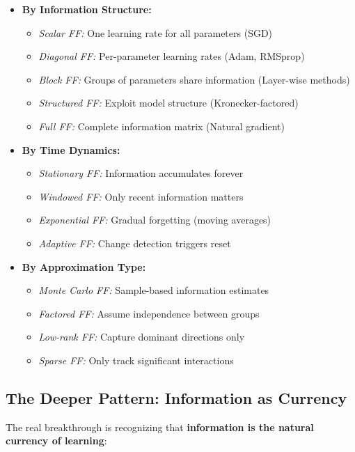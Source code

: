 \documentclass[11pt]{article}
\begin{document}
\begin{itemize}
\item \textbf{By Information Structure:}
  \begin{itemize}
  \item \textit{Scalar FF:} One learning rate for all parameters (SGD)
  \item \textit{Diagonal FF:} Per-parameter learning rates (Adam, RMSprop)
  \item \textit{Block FF:} Groups of parameters share information (Layer-wise methods)
  \item \textit{Structured FF:} Exploit model structure (Kronecker-factored)
  \item \textit{Full FF:} Complete information matrix (Natural gradient)
  \end{itemize}
  
\item \textbf{By Time Dynamics:}
  \begin{itemize}
  \item \textit{Stationary FF:} Information accumulates forever
  \item \textit{Windowed FF:} Only recent information matters
  \item \textit{Exponential FF:} Gradual forgetting (moving averages)
  \item \textit{Adaptive FF:} Change detection triggers reset
  \end{itemize}
  
\item \textbf{By Approximation Type:}
  \begin{itemize}
  \item \textit{Monte Carlo FF:} Sample-based information estimates
  \item \textit{Factored FF:} Assume independence between groups
  \item \textit{Low-rank FF:} Capture dominant directions only
  \item \textit{Sparse FF:} Only track significant interactions
  \end{itemize}
\end{itemize}

\subsection{The Deeper Pattern: Information as Currency}

The real breakthrough is recognizing that \textbf{information is the natural currency of learning}:
\end{document}
